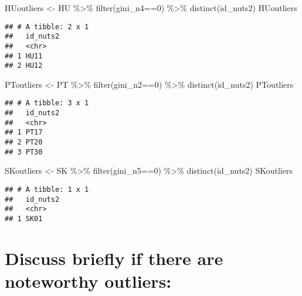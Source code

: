 \documentclass[
]{article}
\newenvironment{Shaded}{\begin{snugshade}}{\end{snugshade}}
\newcommand{\DecValTok}[1]{\textcolor[rgb]{0.00,0.00,0.81}{#1}}
\newcommand{\FunctionTok}[1]{\textcolor[rgb]{0.00,0.00,0.00}{#1}}
\newcommand{\NormalTok}[1]{#1}
\newcommand{\OtherTok}[1]{\textcolor[rgb]{0.56,0.35,0.01}{#1}}
\newcommand{\SpecialCharTok}[1]{\textcolor[rgb]{0.00,0.00,0.00}{#1}}
\begin{document}
\begin{Shaded}
\begin{Highlighting}[]
\NormalTok{HUoutliers }\OtherTok{\textless{}{-}}\NormalTok{ HU }\SpecialCharTok{\%\textgreater{}\%}
  \FunctionTok{filter}\NormalTok{(gini\_n4}\SpecialCharTok{==}\DecValTok{0}\NormalTok{) }\SpecialCharTok{\%\textgreater{}\%}
  \FunctionTok{distinct}\NormalTok{(id\_nuts2)}
\NormalTok{HUoutliers}
\end{Highlighting}
\end{Shaded}

\begin{verbatim}
## # A tibble: 2 x 1
##   id_nuts2
##   <chr>   
## 1 HU11    
## 2 HU12
\end{verbatim}

\begin{Shaded}
\begin{Highlighting}[]
\NormalTok{PToutliers }\OtherTok{\textless{}{-}}\NormalTok{ PT }\SpecialCharTok{\%\textgreater{}\%}
  \FunctionTok{filter}\NormalTok{(gini\_n2}\SpecialCharTok{==}\DecValTok{0}\NormalTok{) }\SpecialCharTok{\%\textgreater{}\%}
  \FunctionTok{distinct}\NormalTok{(id\_nuts2)}
\NormalTok{PToutliers}
\end{Highlighting}
\end{Shaded}

\begin{verbatim}
## # A tibble: 3 x 1
##   id_nuts2
##   <chr>   
## 1 PT17    
## 2 PT20    
## 3 PT30
\end{verbatim}

\begin{Shaded}
\begin{Highlighting}[]
\NormalTok{SKoutliers }\OtherTok{\textless{}{-}}\NormalTok{ SK }\SpecialCharTok{\%\textgreater{}\%}
  \FunctionTok{filter}\NormalTok{(gini\_n5}\SpecialCharTok{==}\DecValTok{0}\NormalTok{) }\SpecialCharTok{\%\textgreater{}\%}
  \FunctionTok{distinct}\NormalTok{(id\_nuts2)}
\NormalTok{SKoutliers}
\end{Highlighting}
\end{Shaded}

\begin{verbatim}
## # A tibble: 1 x 1
##   id_nuts2
##   <chr>   
## 1 SK01
\end{verbatim}

\hypertarget{discuss-briefly-if-there-are-noteworthy-outliers}{%
\section{Discuss briefly if there are noteworthy
outliers:}\label{discuss-briefly-if-there-are-noteworthy-outliers}}
\end{document}
